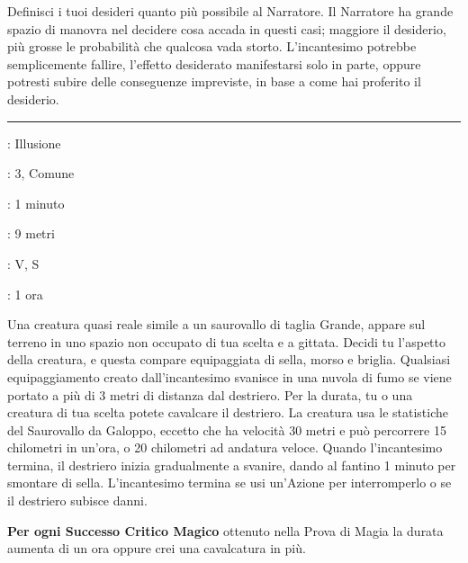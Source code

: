 \begin{multicols}{2}
\medskip
Definisci i tuoi desideri quanto più possibile al Narratore. Il Narratore ha grande spazio di manovra nel decidere cosa accada in questi casi; maggiore il desiderio, più grosse le probabilità che qualcosa vada storto. L'incantesimo potrebbe semplicemente fallire, l'effetto desiderato manifestarsi solo in parte, oppure potresti subire delle conseguenze impreviste, in base a come hai proferito il desiderio.


\smallskip\noindent\rule{\linewidth}{2pt} \hypertarget{Destriero Fantasma}{}\smallskip{}
\noindent
\begin{description}[noitemsep, topsep=0pt, parsep=0pt, partopsep=0pt, leftmargin=0cm, labelwidth=2.8cm]
	\item[\textbf{Lista di Magia}]: Illusione
	\item[\textbf{Livello}]: 3, Comune
	\item[\textbf{T. di Lancio}]: 1 minuto
	\item[\textbf{Gittata}]: 9 metri
	\item[\textbf{Componenti}]: V, S
	\item[\textbf{Durata}]: 1 ora
\end{description}

Una creatura quasi reale simile a un saurovallo di taglia Grande, appare sul terreno in uno spazio non occupato di tua scelta e a gittata. Decidi tu l'aspetto della creatura, e questa compare equipaggiata di sella, morso e briglia. Qualsiasi equipaggiamento creato dall'incantesimo svanisce in una nuvola di fumo se viene portato a più di 3 metri di distanza dal destriero. Per la durata, tu o una creatura di tua scelta potete cavalcare il destriero. La creatura usa le statistiche del Saurovallo da Galoppo, eccetto che ha velocità 30 metri e può percorrere 15 chilometri in un'ora, o 20 chilometri ad andatura veloce. Quando l'incantesimo termina, il destriero inizia gradualmente a svanire, dando al fantino 1 minuto per smontare di sella. L'incantesimo termina se usi un'Azione per interromperlo o se il destriero subisce danni.

\textbf{Per ogni Successo Critico Magico} ottenuto nella Prova di Magia la durata aumenta di un ora oppure crei una cavalcatura in più.


\end{multicols}

